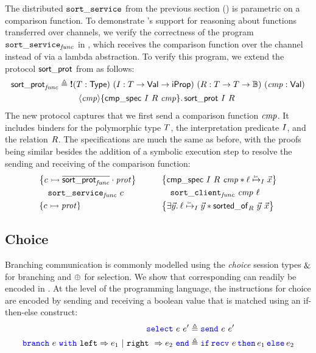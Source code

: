 The distributed $\mathtt{sort\_service}$ from the previous section
() is parametric on a comparison function.
To demonstrate \lname's support for reasoning about functions transferred over
channels, we verify the correctness of the program $\mathtt{sort\_service}_{\mathit{func}}$ in
, which receives the comparison function over the
channel instead of via a lambda abstraction.
To verify this program, we extend the protocol $\mathsf{sort\_prot}$ from
 as follows:
\begin{align*}
\mathsf{sort\_prot}_{\mathit{func}} \triangleq{}& \textnormal{\bf !}
    (T : \mathsf{Type})\ (I : T \to \mathsf{Val} \to \mathsf{iProp})\
    (R : T \to T \to \mathbb{B})\ (\mathit{cmp}: \mathsf{Val})\\
  & \quad \langle \mathit{cmp} \rangle
  {\left\{\mathsf{cmp\_spec}\ I\ R\ \mathit{cmp}\right\}}.\,
  \mathsf{sort\_prot}\ I\ R
\end{align*}
%
The new protocol captures that we first send a comparison function $\mathit{cmp}$.
It includes binders for the polymorphic type $T$, the
interpretation predicate $I$, and the relation $R$.
The specifications are much the same as before, with the proofs being similar
besides the addition of a symbolic execution step to resolve the sending and
receiving of the comparison function:
\[
\begin{array}{c !{\quad} c}
\begin{array}{l}
  \hoareV
    {\interp \chan {\protapp {\dual{\listsortcmpprotname}} \prot}}
    {\listsortcmpservicename\ \chan}
    {\interp \chan \prot}
\end{array}
  &
\begin{array}{l}
\hoareV
  {\cmpspecname\ \interpvar\ \relvar\ \cmpvar *
   \listrefI \interpvar \loc {\vec\var}}
  {\listsortcmpclientname\ \cmpvar\ \loc}
  {\Exists \vec\varB.
   \listrefI \interpvar \loc {\vec\varB} *
   \sortedof {\vec\varB} {\vec\var} \relvar}
\end{array}
\end{array}
\]

\subsection{Choice}
\label{sec:choice}

Branching communication is commonly modelled using the \emph{choice} session types
$\mathop{\&}$ for branching and $\mathop{\oplus}$ for selection.
We show that corresponding \pname can readily be encoded in \lname.
At the level of the programming language, the instructions for choice are
encoded by sending and receiving a boolean value that is matched using an if-then-else construct:
\begin{align*}
\select \expr \expr' \eqdef{}&
  \send \expr \expr' \\
\branchA \expr {\expr_1} {\expr_2} \eqdef{}&
  \If \recv \expr then \expr_1 \Else \expr_2
\end{align*}


